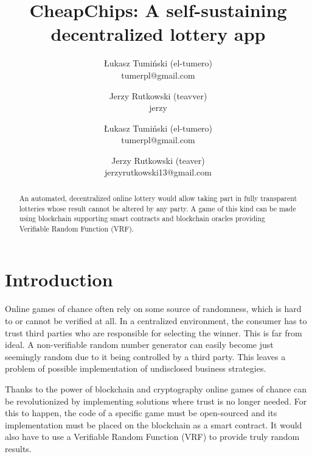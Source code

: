 \documentclass[12pt]{article}
\begin{document}
\title{\textbf{\Huge CheapChips: A self-sustaining decentralized lottery app }}

\author{\normalsize Łukasz Tumiński (el-tumero) \\ \small tumerpl@gmail.com}
\author{\normalsize Jerzy Rutkowski (teavver) \\ \small jerzy}

\author{
  \normalsize Łukasz Tumiński (el-tumero) \\ \small tumerpl@gmail.com
  \and
  \normalsize Jerzy Rutkowski (teaver) \\ \small jerzyrutkowski13@gmail.com
}

\date{}
\maketitle



\begin{abstract}
An automated, decentralized online lottery would allow taking part in fully transparent lotteries whose result cannot be altered by any party. A game of this kind can be made using blockchain supporting smart contracts and blockchain oracles providing Verifiable Random Function (VRF).
\end{abstract}


\section{Introduction}
Online games of chance often rely on some source of randomness, which is hard to or cannot be verified at all. In a centralized environment, the consumer has to trust third parties who are responsible for selecting the winner. This is far from ideal. A non-verifiable random number generator can easily become just seemingly random due to it being controlled by a third party. This leaves a problem of possible implementation of undisclosed business strategies.

Thanks to the power of blockchain and cryptography online games of chance can be revolutionized by implementing solutions where trust is no longer needed. For this to happen, the code of a specific game must be open-sourced and its implementation must be placed on the blockchain as a smart contract\cite{smartcontract}. It would also have to use a Verifiable Random Function (VRF) to provide truly random results.
\end{document}
